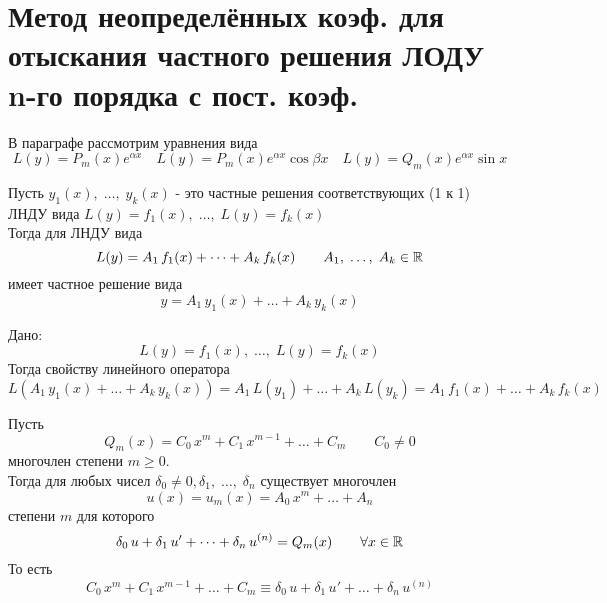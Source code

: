 \section{Метод неопределённых коэф. для отыскания частного решения ЛОДУ n-го порядка с пост. коэф.}

В параграфе рассмотрим уравнения вида
\[
    L(y)=P_m(x) e^{\alpha x} \quad
    L(y)=P_m(x) e^{\alpha x}\cos \beta x \quad
    L(y)=Q_m(x) e^{\alpha x}\sin x
\]

\begin{Th}
    Пусть $y_1(x),\; \dots,\; y_k(x)$ - это частные решения соответствующих (1 к 1) ЛНДУ вида $L(y)=f_1(x),\; \dots,\; L(y)=f_k(x)$\\
    
    Тогда для ЛНДУ вида
    \[
        L(y)=A_1\,f_1(x)+\dots+A_k\,f_k(x) \qquad A_1,\; \dots,\; A_k \in \mathbb{R}
    \]
    имеет частное решение вида 
    \[
        y=A_1\,y_1(x)+\dots+A_k\,y_k(x)
    \]
\end{Th}

\begin{Proof}
    Дано:
    \[
        L(y)=f_1(x),\; \dots,\; L(y)=f_k(x)
    \]
    Тогда свойству линейного оператора
    \[
       L(A_1\,y_1(x)+ \dots + A_k\,y_k(x)) = A_1\,L(y_1)+\dots+A_k\,L(y_k) = A_1\,f_1(x) + \dots + A_k\,f_k(x) 
    \]
\end{Proof}

\begin{Lem}[Алгебраическая]
    Пусть 
    \[
        Q_m(x) = C_0\,x^m+C_1\,x^{m-1}+\dots+C_m \qquad C_0 \neq 0
    \]
    многочлен степени $m \geqslant 0$.\\
    
    Тогда для любых чисел $\delta_0 \neq 0,\delta_1,\; \dots,\; \delta_n$ существует многочлен 
    \[
        u(x)=u_m(x)=A_0\,x^m+\dots+A_n
    \] 
    степени $m$ для которого\\
    \[
        \delta_0\,u+\delta_1\,u'+\dots+\delta_n\,u^{(n)}=Q_m(x) \qquad \forall x \in \mathbb{R}
    \]
    То есть
    \[
        C_0\,x^m+C_1\,x^{m-1}+\dots+C_m \equiv \delta_0\,u+\delta_1\,u'+\dots+\delta_n\,u^{(n)}
    \]
\end{Lem}

